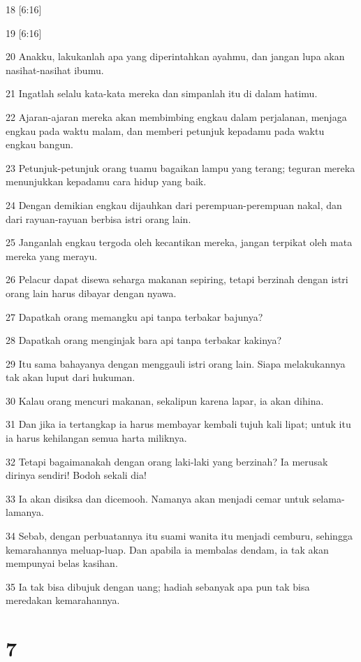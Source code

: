 \par 18 [6:16]
\par 19 [6:16]
\par 20 Anakku, lakukanlah apa yang diperintahkan ayahmu, dan jangan lupa akan nasihat-nasihat ibumu.
\par 21 Ingatlah selalu kata-kata mereka dan simpanlah itu di dalam hatimu.
\par 22 Ajaran-ajaran mereka akan membimbing engkau dalam perjalanan, menjaga engkau pada waktu malam, dan memberi petunjuk kepadamu pada waktu engkau bangun.
\par 23 Petunjuk-petunjuk orang tuamu bagaikan lampu yang terang; teguran mereka menunjukkan kepadamu cara hidup yang baik.
\par 24 Dengan demikian engkau dijauhkan dari perempuan-perempuan nakal, dan dari rayuan-rayuan berbisa istri orang lain.
\par 25 Janganlah engkau tergoda oleh kecantikan mereka, jangan terpikat oleh mata mereka yang merayu.
\par 26 Pelacur dapat disewa seharga makanan sepiring, tetapi berzinah dengan istri orang lain harus dibayar dengan nyawa.
\par 27 Dapatkah orang memangku api tanpa terbakar bajunya?
\par 28 Dapatkah orang menginjak bara api tanpa terbakar kakinya?
\par 29 Itu sama bahayanya dengan menggauli istri orang lain. Siapa melakukannya tak akan luput dari hukuman.
\par 30 Kalau orang mencuri makanan, sekalipun karena lapar, ia akan dihina.
\par 31 Dan jika ia tertangkap ia harus membayar kembali tujuh kali lipat; untuk itu ia harus kehilangan semua harta miliknya.
\par 32 Tetapi bagaimanakah dengan orang laki-laki yang berzinah? Ia merusak dirinya sendiri! Bodoh sekali dia!
\par 33 Ia akan disiksa dan dicemooh. Namanya akan menjadi cemar untuk selama-lamanya.
\par 34 Sebab, dengan perbuatannya itu suami wanita itu menjadi cemburu, sehingga kemarahannya meluap-luap. Dan apabila ia membalas dendam, ia tak akan mempunyai belas kasihan.
\par 35 Ia tak bisa dibujuk dengan uang; hadiah sebanyak apa pun tak bisa meredakan kemarahannya.

\chapter{7}

